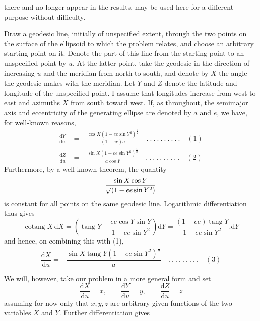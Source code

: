 %
there and no longer appear in the results, may be used here for a different purpose without difficulty.

Draw a geodesic line, initially of unspecified extent, through the two points on the surface of the ellipsoid to which the problem relates, and choose an arbitrary starting point on it. Denote the part of this line from the starting point to an unspecified point by \(u\). At the latter point, take the geodesic in the direction of increasing \(u\) and the meridian from north to south, and denote by \(X\) the angle the geodesic makes with the meridian. Let \(Y\) and \(Z\) denote the latitude and longitude of the unspecified point. I assume that longitudes increase from west to east and azimuths \(X\) from south toward west. If, as throughout, the semimajor axis and eccentricity of the generating ellipse are denoted by \(a\) and \(e\), we have, for well-known reasons,
\[
\begin{aligned}
\frac{\mathrm{d}Y}{\mathrm{d}u}&=-\frac{\cos X(1-ee\sin Y^2)^{\frac32}}{(1-ee)a}\quad .\ .\ .\ .\ .\ .\ .\ .\ .\ .\quad(1)\\
\frac{\mathrm{d}Z}{\mathrm{d}u}&=-\frac{\sin X(1-ee\sin Y^2)^{\frac12}}{a\cos Y}\quad .\ .\ .\ .\ .\ .\ .\ .\ .\ .\quad(2)
\end{aligned}
\]
Furthermore, by a well-known theorem, the quantity
\[
\frac{\sin X\cos Y}{\mathord{{}^{}\!\surd}(1-ee\sin Y^2)}
\]
is constant for all points on the same geodesic line. Logarithmic differentiation thus gives
\[
\operatorname{cotang}X\,\mathrm{d}X=(\operatorname{tang}Y-\frac{ee\cos Y\sin Y}{1-ee\sin Y^2})\mathrm{d}Y=\frac{(1-ee)\operatorname{tang}Y}{1-ee\sin Y^2}\mathord{.}\mathrm{d}Y
\]
and hence, on combining this with (1),
\[
\frac{\mathrm{d}X}{\mathrm{d}u}=-\frac{\sin X\operatorname{tang}Y(1-ee\sin Y^2)^{\frac12}}{a}\quad .\ .\ .\ .\ .\ .\ .\ .\ .\quad(3)
\]

\indent We will, however, take our problem in a more general form and set
\[
\frac{\mathrm{d}X}{\mathrm{d}u}=x,\qquad\frac{\mathrm{d}Y}{\mathrm{d}u}=y,\qquad\frac{\mathrm{d}Z}{\mathrm{d}u}=z
\]
assuming for now only that \(x,y,z\) are arbitrary given functions of the two variables \(X\) and \(Y\). Further differentiation gives
